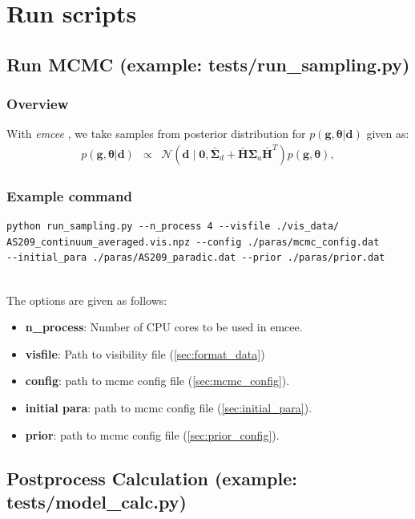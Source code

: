 \documentclass{report}
\begin{document}
\chapter{Run scripts \label{sec:run_script}}
\section{Run MCMC (example: tests/run\_sampling.py) \label{sec:mcmc_run}}
\subsection{Overview}

With {\it emcee} \citep{2013PASP..125..306F}, we take samples from posterior distribution for $ p(\bm{g} , \bm{\theta}|\bm{d})$ given as: 
\begin{eqnarray}
   p(\bm{g} , \bm{\theta}|\bm{d}) &\propto&  \mathcal{N}(\bm{d} \mid \bm{0}, \bar{\bm{\Sigma}}_{d} +   \bar{\bm{H}} \bm{\Sigma}_{a} \bar{\bm{H}}^{T}) p(\bm{g} , \bm{\theta}), 
\end{eqnarray}

\subsection{Example command}

\begin{verbatim}
python run_sampling.py --n_process 4 --visfile ./vis_data/
AS209_continuum_averaged.vis.npz --config ./paras/mcmc_config.dat 
--initial_para ./paras/AS209_paradic.dat --prior ./paras/prior.dat 


\end{verbatim}

The options are given as follows: 
    \begin{itemize}
        \item \textbf{n\_process}: Number of CPU cores to be used in emcee.
        \item \textbf{visfile}: Path to visibility file (\ref{sec:format_data})
        \item \textbf{config}: path to mcmc config file (\ref{sec:mcmc_config}). 
        \item \textbf{initial para}: path to mcmc config file (\ref{sec:initial_para}). 
        \item \textbf{prior}: path to mcmc config file (\ref{sec:prior_config}). 
    \end{itemize}



\section{ Postprocess Calculation  (example: tests/model\_calc.py)}
\end{document}
